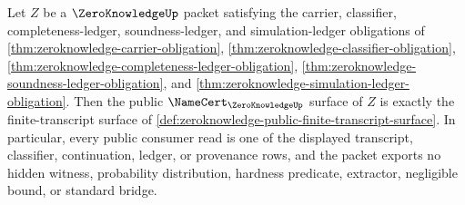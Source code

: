 \begin{theorem}
\label{thm:zeroknowledge-public-finite-transcript-surface}
Let $Z$ be a $\ZeroKnowledgeUp$ packet satisfying the carrier, classifier, completeness-ledger, soundness-ledger, and simulation-ledger obligations of \autoref{thm:zeroknowledge-carrier-obligation}, \autoref{thm:zeroknowledge-classifier-obligation}, \autoref{thm:zeroknowledge-completeness-ledger-obligation}, \autoref{thm:zeroknowledge-soundness-ledger-obligation}, and \autoref{thm:zeroknowledge-simulation-ledger-obligation}. Then the public $\NameCert_{\ZeroKnowledgeUp}$ surface of $Z$ is exactly the finite-transcript surface of \autoref{def:zeroknowledge-public-finite-transcript-surface}. In particular, every public consumer read is one of the displayed transcript, classifier, continuation, ledger, or provenance rows, and the packet exports no hidden witness, probability distribution, hardness predicate, extractor, negligible bound, or standard bridge.
\end{theorem}

